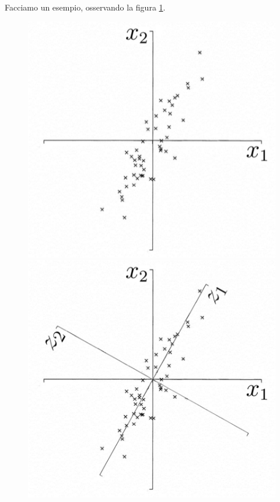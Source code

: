 \noindent Facciamo un esempio, osservando la figura \ref{pca}.
\begin{figure}
\centering
\includegraphics[scale=0.8]{img/pca.png}
\includegraphics[scale=0.8]{img/pca1.png}
\label{pca}
\end{figure}
